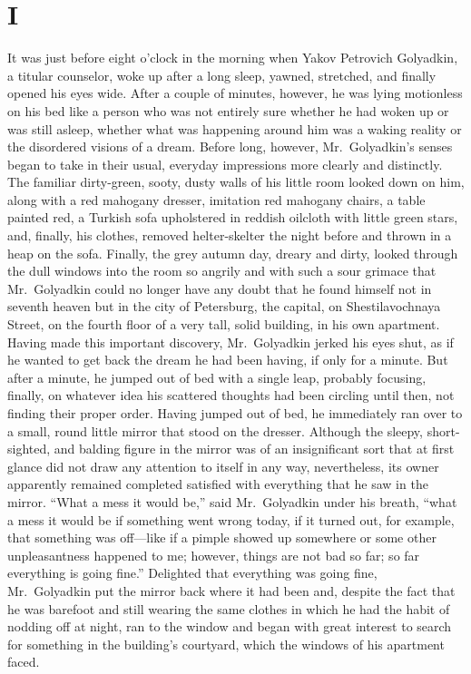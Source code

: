 \chapter*{I}

It was just before eight o'clock in the morning when Yakov Petrovich Golyadkin, a titular counselor, woke up after a long sleep, yawned, stretched, and finally opened his eyes wide. After a couple of minutes, however, he was lying motionless on his bed like a person who was not entirely sure whether he had woken up or was still asleep, whether what was happening around him was a waking reality or the disordered visions of a dream. Before long, however, Mr.~Golyadkin's senses began to take in their usual, everyday impressions more clearly and distinctly. The familiar dirty-green, sooty, dusty walls of his little room looked down on him, along with a red mahogany dresser, imitation red mahogany chairs, a table painted red, a Turkish sofa upholstered in reddish oilcloth with little green stars, and, finally, his clothes, removed helter-skelter the night before and thrown in a heap on the sofa. Finally, the grey autumn day, dreary and dirty, looked through the dull windows into the room so angrily and with such a sour grimace that Mr.~Golyadkin could no longer have any doubt that he found himself not in seventh heaven but in the city of Petersburg, the capital, on Shestilavochnaya Street, on the fourth floor of a very tall, solid building, in his own apartment. Having made this important discovery, Mr.~Golyadkin jerked his eyes shut, as if he wanted to get back the dream he had been having, if only for a minute. But after a minute, he jumped out of bed with a single leap, probably focusing, finally, on whatever idea his scattered thoughts had been circling until then, not finding their proper order. Having jumped out of bed, he immediately ran over to a small, round little mirror that stood on the dresser. Although the sleepy, short-sighted, and balding figure in the mirror was of an insignificant sort that at first glance did not draw any attention to itself in any way, nevertheless, its owner apparently remained completed satisfied with everything that he saw in the mirror. ``What a mess it would be,'' said Mr.~Golyadkin under his breath, ``what a mess it would be if something went wrong today, if it turned out, for example, that something was off---like if a pimple showed up somewhere or some other unpleasantness happened to me; however, things are not bad so far; so far everything is going fine.'' Delighted that everything was going fine, Mr.~Golyadkin put the mirror back where it had been and, despite the fact that he was barefoot and still wearing the same clothes in which he had the habit of nodding off at night, ran to the window and began with great interest to search for something in the building's courtyard, which the windows of his apartment faced. %

